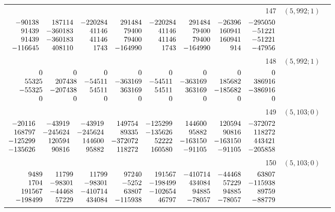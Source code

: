 \documentclass[11pt]{article}
\theoremstyle{remark}
\numberwithin{equation}{section}
\begin{document}
\begin{longtable}{rcl}
147 & $(5,992;1)$ & \begin{tabular}[t]{@{}l@{}}$w_i=\displaystyle \frac{8345335823459478377}{6720856760359116258192000000000000000}$\\[3pt]{\scriptsize$\begin{array}{@{}rrrrrrrr@{}}-90138 & 187114 & -220284 & 291484 & -220284 & 291484 & -26396 & -295050\\91439 & -360183 & 41146 & 79400 & 41146 & 79400 & 160941 & -51221\\91439 & -360183 & 41146 & 79400 & 41146 & 79400 & 160941 & -51221\\-116645 & 408110 & 1743 & -164990 & 1743 & -164990 & 914 & -47956\end{array}$}\end{tabular}\\[8pt]
148 & $(5,992;1)$ & \begin{tabular}[t]{@{}l@{}}$w_i=\displaystyle \frac{506456769176658779}{449801071795995383312000000000000000}$\\[3pt]{\scriptsize$\begin{array}{@{}rrrrrrrr@{}}0 & 0 & 0 & 0 & 0 & 0 & 0 & 0\\55325 & 207438 & -54511 & -363169 & -54511 & -363169 & 185682 & 386916\\-55325 & -207438 & 54511 & 363169 & 54511 & 363169 & -185682 & -386916\\0 & 0 & 0 & 0 & 0 & 0 & 0 & 0\end{array}$}\end{tabular}\\[8pt]
149 & $(5,103;0)$ & \begin{tabular}[t]{@{}l@{}}$w_i=\displaystyle \frac{8977039161301673}{43020226616174764800000000000000000}$\\[3pt]{\scriptsize$\begin{array}{@{}rrrrrrrr@{}}-20116 & -43919 & -43919 & 149754 & -125299 & 144600 & 120594 & -372072\\168797 & -245624 & -245624 & 89335 & -135626 & 95882 & 90816 & 118272\\-125299 & 120594 & 144600 & -372072 & 52222 & -163150 & -163150 & 443421\\-135626 & 90816 & 95882 & 118272 & 160580 & -91105 & -91105 & -205858\end{array}$}\end{tabular}\\[8pt]
150 & $(5,103;0)$ & \begin{tabular}[t]{@{}l@{}}$w_i=\displaystyle \frac{828950085459354839}{3197060551531908804992000000000000000}$\\[3pt]{\scriptsize$\begin{array}{@{}rrrrrrrr@{}}9489 & 11799 & 11799 & 97240 & 191567 & -410714 & -44468 & 63807\\1704 & -98301 & -98301 & -5252 & -198499 & 434084 & 57229 & -115938\\191567 & -44468 & -410714 & 63807 & -102654 & 94885 & 94885 & 89759\\-198499 & 57229 & 434084 & -115938 & 46797 & -78057 & -78057 & -88779\end{array}$}\end{tabular}\\[8pt]

\end{longtable}
\end{document}
